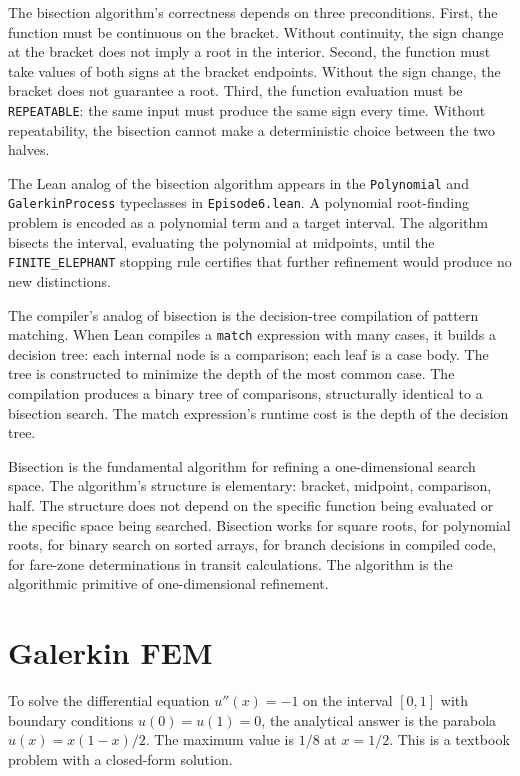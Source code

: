 The bisection algorithm's correctness depends on three preconditions.
First, the function must be continuous on the bracket. Without
continuity, the sign change at the bracket does not imply a root in
the interior. Second, the function must take values of both signs at
the bracket endpoints. Without the sign change, the bracket does not
guarantee a root. Third, the function evaluation must be
\texttt{REPEATABLE}: the same input must produce the same sign every
time. Without repeatability, the bisection cannot make a deterministic
choice between the two halves.

The Lean analog of the bisection algorithm appears in the
\texttt{Polynomial} and \texttt{GalerkinProcess} typeclasses in
\texttt{Episode6.lean}. A polynomial root-finding problem is encoded
as a polynomial term and a target interval. The algorithm bisects the
interval, evaluating the polynomial at midpoints, until the
\texttt{FINITE\_ELEPHANT} stopping rule certifies that further
refinement would produce no new distinctions.

The compiler's analog of bisection is the decision-tree compilation of
pattern matching. When Lean compiles a \texttt{match} expression with
many cases, it builds a decision tree: each internal node is a
comparison; each leaf is a case body. The tree is constructed to
minimize the depth of the most common case. The compilation produces a
binary tree of comparisons, structurally identical to a bisection
search. The match expression's runtime cost is the depth of the
decision tree.

Bisection is the fundamental algorithm for refining a one-dimensional
search space. The algorithm's structure is elementary: bracket,
midpoint, comparison, half. The structure does not depend on the
specific function being evaluated or the specific space being searched.
Bisection works for square roots, for polynomial roots, for binary
search on sorted arrays, for branch decisions in compiled code, for
fare-zone determinations in transit calculations. The algorithm is the
algorithmic primitive of one-dimensional refinement.

\section{Galerkin FEM}
\label{se:galerkin-fem}

To solve the differential equation $u''(x) = -1$ on the interval $[0, 1]$
with boundary conditions $u(0) = u(1) = 0$, the analytical answer is the
parabola $u(x) = x(1-x)/2$. The maximum value is $1/8$ at $x = 1/2$.
This is a textbook problem with a closed-form solution.

